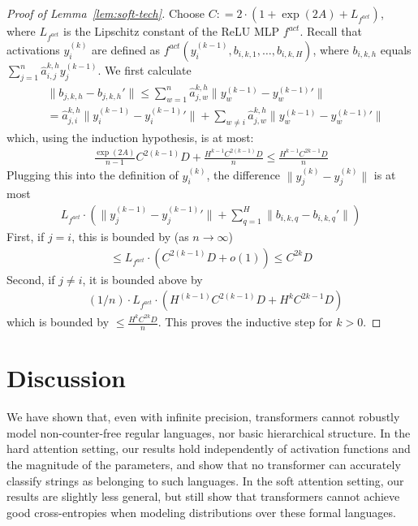 \documentclass[11pt,a4paper]{article}
\begin{document}
\begin{proof}[Proof of Lemma~\ref{lem:soft-tech}]
Choose $C : = 2\cdot (1 + \exp(2A) + L_{f^{act}})$, where $L_{f^{act}}$ is the Lipschitz constant of the ReLU MLP $f^{act}$. 
Recall that activations $y_i^{(k)}$ are defined as $f^{act}(y_i^{(k-1)}, b_{i,k,1}, \dots, b_{i,k,H})$, where $b_{i,k,h}$ equals $\sum_{j=1}^n \hat{a}_{i,j}^{k,h} y_j^{(k-1)}$.
We first calculate
\begin{align*}
& \|b_{j,k,h} - b_{j,k,h}'\|  \leq \sum_{w=1}^n \hat{a}_{j,w}^{k,h} \|y_w^{(k-1)} - {y}_w^{(k-1)}'\|
\\
& = \hat{a}_{j,i}^{k,h} \|y_i^{(k-1)} - {y}_i^{(k-1)}'\|  + \sum_{w \neq i} \hat{a}_{j,w}^{k,h} \|y_w^{(k-1)} - {y}_w^{(k-1)}'\|
\end{align*}
which, using the induction hypothesis, is at most:
\begin{align*}
\frac{\exp(2A)}{n-1}  C^{2(k-1)} D + \frac{H^{k-1}C^{2(k-1)}D}{n} \leq \frac{H^{k-1} C^{2k-1} D}{n}
\end{align*}
Plugging this into the definition of $y_i^{(k)}$, the difference $\|y_j^{(k)} - {y_j^{(k)}}\|$ is at most
\begin{align*}
	L_{f^{act}} \cdot \left(\|y_j^{(k-1)}-{y_j^{(k-1)}}'\| + \sum_{q=1}^H \|b_{i,k,q} - b_{i,k,q}'\|\right)
\end{align*}
First, if $j= i$, this is bounded by (as $n \rightarrow \infty$)
\begin{align*}
\leq L_{f^{act}} \cdot \left(C^{2(k-1)}D + o(1)\right) \leq C^{2k}D
\end{align*}
Second, if $j\neq i$, it is bounded above by
\begin{align*}
	&  (1/n) \cdot L_{f^{act}} \cdot \left(H^{(k-1)} C^{2(k-1)}D + H^{k} C^{2k-1} D\right)
\end{align*} 
which is bounded by $\leq  \frac{H^{k} C^{2k} D}{n}$.
This proves the inductive step for $k>0$.
\end{proof}




\section{Discussion}\label{sec:discussion}

We have shown that, even with infinite precision, transformers cannot robustly model non-counter-free regular languages, nor basic hierarchical structure.
In the hard attention setting, our results hold independently of activation functions and the magnitude of the parameters, and show that no transformer   can accurately classify strings as belonging to such languages.
In the soft attention setting, our results are slightly less general, but still show that transformers cannot achieve good cross-entropies when modeling distributions over these formal languages.
\end{document}

